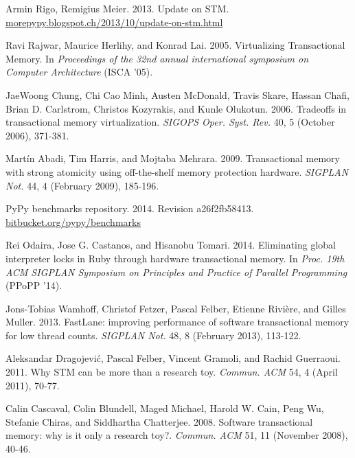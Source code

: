 \documentclass{sigplanconf}
\begin{document}
\begin{thebibliography}{}
 Armin Rigo, Remigius Meier. 2013. Update on
  STM. \url{morepypy.blogspot.ch/2013/10/update-on-stm.html}

 Ravi Rajwar, Maurice Herlihy, and Konrad
  Lai. 2005. Virtualizing Transactional Memory. In \emph{Proceedings of
    the 32nd annual international symposium on Computer Architecture}
  (ISCA '05).

 JaeWoong Chung, Chi Cao Minh, Austen McDonald,
  Travis Skare, Hassan Chafi, Brian D. Carlstrom, Christos Kozyrakis,
  and Kunle Olukotun. 2006. Tradeoffs in transactional memory
  virtualization. \emph{SIGOPS Oper. Syst. Rev.} 40, 5 (October 2006),
  371-381.

 Martín Abadi, Tim Harris, and Mojtaba
  Mehrara. 2009. Transactional memory with strong atomicity using
  off-the-shelf memory protection hardware. \emph{SIGPLAN Not.} 44, 4
  (February 2009), 185-196.

 PyPy benchmarks repository. 2014. Revision
  a26f2fb58413. \url{bitbucket.org/pypy/benchmarks}





  Rei Odaira, Jose G. Castanos, and Hisanobu Tomari. 2014. Eliminating
  global interpreter locks in Ruby through hardware transactional
  memory. In \emph{Proc. 19th ACM SIGPLAN Symposium on
    Principles and Practice of Parallel Programming} (PPoPP '14).

  Jons-Tobias Wamhoff, Christof Fetzer, Pascal Felber, Etienne Rivière,
  and Gilles Muller. 2013. FastLane: improving performance of software
  transactional memory for low thread counts. \emph{SIGPLAN Not.} 48, 8
  (February 2013), 113-122.

 Aleksandar Dragojević, Pascal Felber, Vincent
  Gramoli, and Rachid Guerraoui. 2011. Why STM can be more than a
  research toy. \emph{Commun. ACM} 54, 4 (April 2011), 70-77.

  Calin Cascaval, Colin Blundell, Maged Michael, Harold W. Cain, Peng
  Wu, Stefanie Chiras, and Siddhartha Chatterjee. 2008. Software
  transactional memory: why is it only a research
  toy?. \emph{Commun. ACM} 51, 11 (November 2008), 40-46.


\end{thebibliography}
\end{document}
